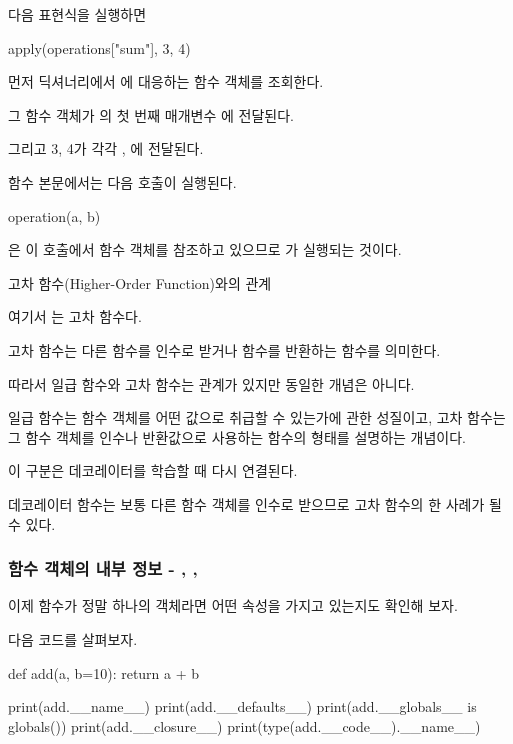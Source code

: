 다음 표현식을 실행하면

\begin{dhkcode}
apply(operations["sum"], 3, 4)
\end{dhkcode}

먼저 딕셔너리에서 에 대응하는 함수 객체를 조회한다.

그 함수 객체가 의 첫 번째 매개변수 에 전달된다.

그리고 3, 4가 각각 , 에 전달된다.

함수 본문에서는 다음 호출이 실행된다.

\begin{dhkcode}
operation(a, b)
\end{dhkcode}

은 이 호출에서  함수 객체를 참조하고 있으므로 가 실행되는 것이다.

\begin{dhknote}
\begin{dhksmry}[centered]
고차 함수(Higher-Order Function)와의 관계
\end{dhksmry}
\end{dhknote}

여기서 는 고차 함수다.

고차 함수는 다른 함수를 인수로 받거나 함수를 반환하는 함수를 의미한다.

따라서 일급 함수와 고차 함수는 관계가 있지만 동일한 개념은 아니다.

일급 함수는 함수 객체를 어떤 값으로 취급할 수 있는가에 관한 성질이고, 고차 함수는 그 함수 객체를 인수나 반환값으로 사용하는 함수의 형태를 설명하는 개념이다.

이 구분은 데코레이터를 학습할 때 다시 연결된다.

데코레이터 함수는 보통 다른 함수 객체를 인수로 받으므로 고차 함수의 한 사례가 될 수 있다.

\subsubsection{함수 객체의 내부 정보 - , , }

이제 함수가 정말 하나의 객체라면 어떤 속성을 가지고 있는지도 확인해 보자.

다음 코드를 살펴보자.

\begin{dhkcode}
def add(a, b=10):
    return a + b

print(add.__name__)
print(add.__defaults__)
print(add.__globals__ is globals())
print(add.__closure__)
print(type(add.__code__).__name__)
\end{dhkcode}

